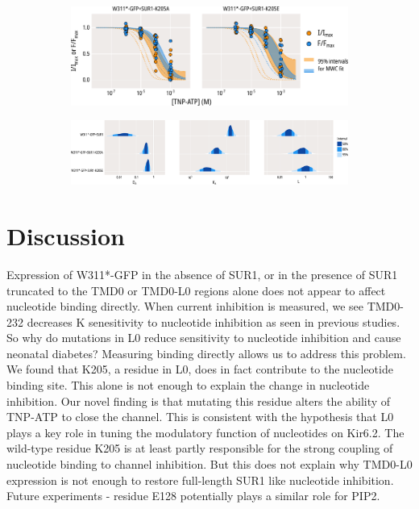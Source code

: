 \begin{figure}[h]
	\centering
	\begin{subfigure}[t]{0.9\textwidth}
		\caption{}\label{ch6fig:mwc_k205_1}
		\centering
		\includegraphics[width=\textwidth]{mwc_k205_1.pdf}
	\end{subfigure}
	\vfill
	\begin{subfigure}[t]{0.9\textwidth}
		\caption{}\label{ch6fig:mwc_k205_2}
		\centering
		\includegraphics[width=\textwidth]{mwc_k205_2.pdf}
	\end{subfigure}
	\caption[K205 mutations affect gating and nucleotide binding]{
	}\label{ch6fig:k205_2}
\end{figure}

\section{Discussion}

Expression of W311*-GFP in the absence of SUR1, or in the presence of SUR1 truncated to the TMD0 or TMD0-L0 regions alone does not appear to affect nucleotide binding directly.
When current inhibition is measured, we see TMD0-232 decreases K\ATP{} senesitivity to nucleotide inhibition as seen in previous studies.
So why do mutations in L0 reduce sensitivity to nucleotide inhibition and cause neonatal diabetes?
Measuring binding directly allows us to address this problem.
We found that K205, a residue in L0, does in fact contribute to the nucleotide binding site.
This alone is not enough to explain the change in nucleotide inhibition.
Our novel finding is that mutating this residue alters the ability of TNP-ATP to close the channel.
This is consistent with the hypothesis that L0 plays a key role in tuning the modulatory function of nucleotides on Kir6.2.
The wild-type residue K205 is at least partly responsible for the strong coupling of nucleotide binding to channel inhibition.
But this does not explain why TMD0-L0 expression is not enough to restore full-length SUR1 like nucleotide inhibition.
Future experiments - residue E128 potentially plays a similar role for PIP2.
